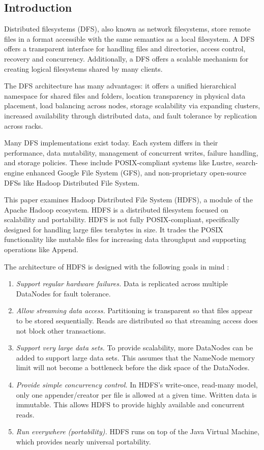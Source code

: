 \documentclass[11pt, a4paper]{article}
\begin{document}
\begin{multicols*}{2}


\section{Introduction}

Distributed filesystems (DFS), also known as network filesystems, store remote files in a format accessible with the same semantics as a local filesystem. A DFS offers a transparent interface for handling files and directories, access control, recovery and concurrency. Additionally, a DFS offers a scalable mechanism for creating logical filesystems shared by many clients.

The DFS architecture has many advantages: it offers a unified hierarchical namespace for shared files and folders, location transparency in physical data placement, load balancing across nodes, storage scalability via expanding clusters, increased availability through distributed data, and fault tolerance by replication across racks.

Many DFS implementations exist today. Each system differs in their performance, data mutability, management of concurrent writes, failure handling, and storage policies. These include POSIX-compliant systems like Lustre, search-engine enhanced Google File System (GFS), and non-proprietary open-source DFSs like Hadoop Distributed File System.

This paper examines Hadoop Distributed File System (HDFS), a module of the Apache Hadoop ecosystem. HDFS is a distributed filesystem focused on scalability and portability. HDFS is not fully POSIX-compliant, specifically designed for handling large files terabytes in size. It trades the POSIX functionality like mutable files for increasing data throughput and supporting operations like Append.

The architecture of HDFS is designed with the following goals in mind \cite{HdfsGuide}:
\begin{enumerate}[noitemsep, label=\arabic*.]
	\item\textit{Support regular hardware failures.} Data is replicated across multiple DataNodes for fault tolerance.
	\item\textit{Allow streaming data access.} Partitioning is transparent so that files appear to be stored sequentially. Reads are distributed so that streaming access does not block other transactions.
	\item\textit{Support very large data sets.} To provide scalability, more DataNodes can be added to support large data sets. This assumes that the NameNode memory limit will not become a bottleneck before the disk space of the DataNodes.
	\item\textit{Provide simple concurrency control.} In HDFS's write-once, read-many model, only one appender/creator per file is allowed at a given time. Written data is immutable. This allows HDFS to provide highly available and concurrent reads.
	\item\textit{Run everywhere (portability).} HDFS runs on top of the Java Virtual Machine, which provides nearly universal portability.
\end{enumerate}


\end{multicols*}
\end{document}
